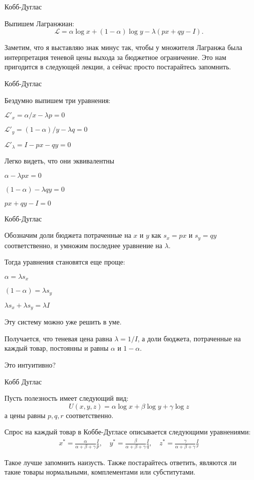 \documentclass{beamer}
\begin{document}
\begin{frame}{Кобб-Дуглас}

Выпишем Лагранжиан:
$$ \mathcal{L} = \alpha \log x + (1-\alpha) \log y - \lambda (px + qy -I).$$ 

Заметим, что я выставляю знак минус так, чтобы у множителя Лагранжа была интерпретация теневой цены выхода за бюджетное ограничение. Это нам пригодится в следующей лекции, а сейчас просто постарайтесь запомнить.
\end{frame}

\begin{frame}{Кобб-Дуглас}

Бездумно выпишем три уравнения:

$\mathcal{L}'_x = \alpha/ x - \lambda p = 0$

$\mathcal{L}'_y = (1-\alpha)/y - \lambda q = 0$

$\mathcal{L}'_{\lambda} = I - p x - qy = 0$

Легко видеть, что они эквивалентны

$\alpha - \lambda p x= 0$

$(1-\alpha) - \lambda q y= 0$

$px + qy - I = 0$

\end{frame}

\begin{frame}{Кобб-Дуглас}

Обозначим доли бюджета потраченные на $x$ и $y$ как $s_x= px$ и $s_y = qy$ соответственно, и умножим последнее уравнение на $\lambda$. 

Тогда уравнения становятся еще проще:

$\alpha = \lambda s_x$

$(1-\alpha) = \lambda s_y$

$\lambda s_x + \lambda s_y = \lambda I$

Эту систему можно уже решить в уме. 

Получается, что теневая цена равна $\lambda = 1/I$, а доли бюджета, потраченные на каждый товар, постоянны и равны $\alpha$ и $1-\alpha$.

Это интуитивно?

\end{frame}

\begin{frame}{Кобб Дуглас}

Пусть полезность имеет следующий вид:
$$U(x,y,z) = \alpha \log x + \beta \log y + \gamma \log z$$ 
а цены равны $p, q, r$ соответственно.

Спрос на каждый товар в Коббе-Дугласе описывается следующими уравнениями:
\begin{gather*}
x^{\ast} = \frac{\alpha}{\alpha + \beta + \gamma} \frac{I}{p}, \quad
y^{\ast} = \frac{\beta}{\alpha + \beta + \gamma} \frac{I}{q}, \quad
z^{\ast} = \frac{\gamma}{\alpha + \beta + \gamma} \frac{I}{r}
\end{gather*}

Такое лучше запомнить наизусть. Также постарайтесь ответить, являются ли такие товары нормальными, комплементами или субститутами.

\end{frame}
\end{document}
